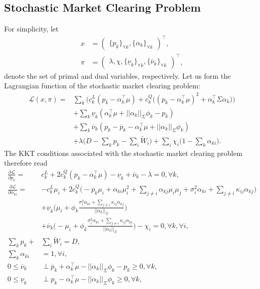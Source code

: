 \documentclass{article}
\begin{document}
\subsection*{Stochastic Market Clearing Problem}
For simplicity, let 
\begin{align*}
x &= \begin{pmatrix} \{p_k\}_{\forall k}, \{\alpha_k\}_{\forall k} \end{pmatrix}^\top,\\
\pi &= \begin{pmatrix} \lambda, \chi, \{\underline{\nu}_k\}_{\forall k}, \{\overline{\nu}_k\}_{\forall k} \end{pmatrix}^\top,
\end{align*}
denote the set of primal and dual variables, respectively. Let us form the Lagrangian function of the stochastic market clearing problem:
\begin{align*}
\mathcal{L}(x, \pi) =& \sum_k \Big(c_k^L(p_k - \alpha_k^\top \mu) + c_k^Q \big((p_k - \alpha_k^\top \mu)^2 + \alpha_k^\top \Sigma \alpha_k\big)\Big)\\
&+ \sum_k \underline{\nu}_k(\alpha_k^\top \mu + ||\alpha_k||_{\Sigma} \phi_k - p_k)\\
&+ \sum_k \overline{\nu}_k (p_k - \overline{p}_k - \alpha_k^\top \mu + ||\alpha_k||_{\Sigma} \phi_k)\\
&+ \lambda\big(D - \sum_k p_k - \sum_i \tilde{W}_i\big) + \sum_i \chi_i \big(1 - \sum_k \alpha_{ki}\big).
\end{align*}
The KKT conditions associated with the stochastic market clearing problem therefore read
\begin{align*}
\frac{\partial \mathcal{L}}{\partial p_k} =& c_k^L + 2 c_k^Q (p_k - \alpha_k^\top \mu) - \underline{\nu}_k + \overline{\nu}_k - \lambda = 0, \forall k,\\
\frac{\partial \mathcal{L}}{\partial \alpha_{ki}} =& - c_k^L \mu_i + 2 c_k^Q\Big(- p_k \mu_i + \alpha_{ki} \mu_i^2 + \sum_{j \ne i} \alpha_{kj} \mu_i \mu_j + \sigma_i^2 \alpha_{ki} + \sum_{j \ne i} \kappa_{ij} \alpha_{kj}\Big)\\
&+ \underline{\nu}_k \Big(\mu_i + \phi_k \frac{\sigma_i^2 \alpha_{ki} + \sum_{j \ne i} \kappa_{ij} \alpha_{kj}}{||\alpha_k||_{\Sigma}}\Big)\\
&+ \overline{\nu}_k \Big(-\mu_i + \phi_k \frac{\sigma_i^2 \alpha_{ki} + \sum_{j \ne i} \kappa_{ij} \alpha_{kj}}{||\alpha_k||_{\Sigma}}\Big) - \chi_i = 0, \forall k, \forall i,\\
\sum_k p_k +& \sum_i \tilde{W}_i = D,\\
\sum_k \alpha_{ki} &= 1, \forall i,\\
0 \le \overline{\nu}_k &\perp \overline{p}_k + \alpha_k^\top \mu - ||\alpha_k||_{\Sigma} \phi_k - p_k \ge 0, \forall k,\\
0 \le \underline{\nu}_k & \perp p_k - \alpha_k^\top \mu - ||\alpha_k||_{\Sigma}\phi_k \ge 0, \forall k,
\end{align*}
\end{document}
